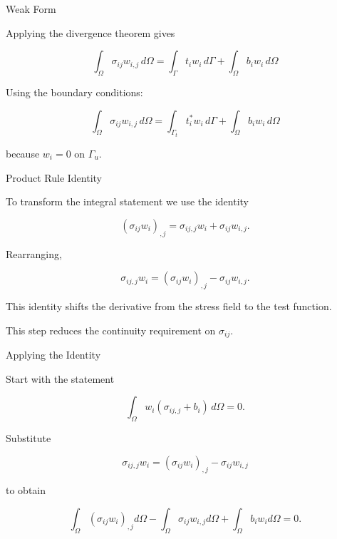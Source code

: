\documentclass[aspectratio=169]{beamer}
\begin{document}
\begin{frame}{Weak Form}

Applying the divergence theorem gives

\[
\int_\Omega \sigma_{ij} w_{i,j}\,d\Omega
=
\int_{\Gamma} t_i w_i\,d\Gamma
+
\int_\Omega b_i w_i\,d\Omega
\]

Using the boundary conditions:

\[
\int_\Omega \sigma_{ij} w_{i,j}\,d\Omega
=
\int_{\Gamma_t} t_i^* w_i\,d\Gamma
+
\int_\Omega b_i w_i\,d\Omega
\]

because $w_i=0$ on $\Gamma_u$.

\end{frame}

\begin{frame}{Product Rule Identity}

To transform the integral statement we use the identity

\[
(\sigma_{ij} w_i)_{,j}
=
\sigma_{ij,j} w_i
+
\sigma_{ij} w_{i,j}.
\]

Rearranging,

\[
\sigma_{ij,j} w_i
=
(\sigma_{ij} w_i)_{,j}
-
\sigma_{ij} w_{i,j}.
\]

This identity shifts the derivative from the stress field
to the test function.

\bigskip

This step reduces the continuity requirement on $\sigma_{ij}$.

\end{frame}

\begin{frame}{Applying the Identity}

Start with the statement

\[
\int_\Omega w_i (\sigma_{ij,j}+b_i) \, d\Omega = 0.
\]

Substitute

\[
\sigma_{ij,j} w_i
=
(\sigma_{ij} w_i)_{,j}
-
\sigma_{ij} w_{i,j}
\]

to obtain

\[
\int_\Omega
(\sigma_{ij} w_i)_{,j} d\Omega
-
\int_\Omega
\sigma_{ij} w_{i,j} d\Omega
+
\int_\Omega
b_i w_i d\Omega
=0.
\]

\end{frame}
\end{document}
